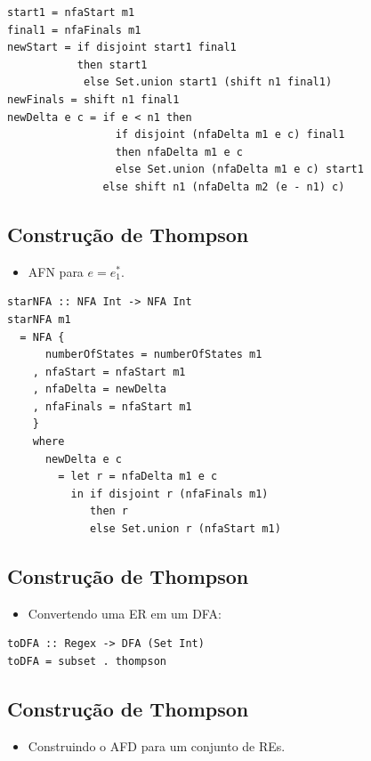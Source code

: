 \documentclass[11pt]{article}
\begin{document}
\begin{verbatim}
start1 = nfaStart m1
final1 = nfaFinals m1
newStart = if disjoint start1 final1
           then start1
            else Set.union start1 (shift n1 final1)
newFinals = shift n1 final1
newDelta e c = if e < n1 then
                 if disjoint (nfaDelta m1 e c) final1
                 then nfaDelta m1 e c
                 else Set.union (nfaDelta m1 e c) start1
               else shift n1 (nfaDelta m2 (e - n1) c)
\end{verbatim}
\subsection*{Construção de Thompson}
\label{sec:org9ba737e}

\begin{itemize}
\item AFN para \(e = e_1^*\).
\end{itemize}

\begin{verbatim}
starNFA :: NFA Int -> NFA Int
starNFA m1
  = NFA {
      numberOfStates = numberOfStates m1
    , nfaStart = nfaStart m1
    , nfaDelta = newDelta
    , nfaFinals = nfaStart m1
    }
    where
      newDelta e c
        = let r = nfaDelta m1 e c
          in if disjoint r (nfaFinals m1)
             then r
             else Set.union r (nfaStart m1)
\end{verbatim}
\subsection*{Construção de Thompson}
\label{sec:org232dbd1}

\begin{itemize}
\item Convertendo uma ER em um DFA:
\end{itemize}

\begin{verbatim}
toDFA :: Regex -> DFA (Set Int)
toDFA = subset . thompson
\end{verbatim}
\subsection*{Construção de Thompson}
\label{sec:orga603a9c}

\begin{itemize}
\item Construindo o AFD para um conjunto de REs.
\end{itemize}
\end{document}

